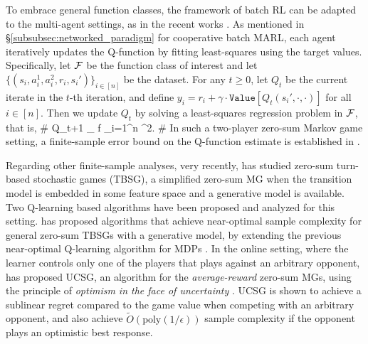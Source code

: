    
   
   To embrace general function classes, the framework of batch RL \cite{lagoudakis2002value,munos2007performance,munos2008finite,antos2008fitted,antos2008learning,farahmand2016regularized} can be adapted to  the multi-agent settings, as in the recent works  \cite{yang2019theoretical,zhang2018finite}.      As mentioned  in \S\ref{subsubsec:networked_paradigm} for cooperative batch MARL,   each agent  iteratively  updates the Q-function by fitting least-squares using  the target values.  Specifically, let $\mathcal{F}$ be the function class of interest and let $  \{ (s_i, a_i^1, a_i^2, r_i, s_i' ) \}_{i\in[n]}$ be the dataset. For any $t \geq 0$,   let $Q_{t}$ be the current iterate in the $t$-th iteration, and  define $y_i = r_i + \gamma \cdot \texttt{Value} [ Q_{t} (s_i', \cdot , \cdot )]$ for all $i \in [n]$. Then we update $ Q_{t}$   by solving a least-squares regression problem in $\mathcal{F}$, that is, 
  \#\label{eq:FQI}
  Q_{t+1} \leftarrow \argmin_{ f\in \cF}  \sum_{i=1}^n \bigl [ y_i - f(s_i, a_i^1, a_i^2 ) \bigr ]^2.
  \#
  In such a two-player zero-sum Markov game setting, 
a finite-sample error bound on the Q-function estimate  is established in    \cite{yang2019theoretical}. 


Regarding other finite-sample analyses, 
very recently, \cite{jia2019feature} has studied   zero-sum turn-based stochastic games (TBSG), a simplified zero-sum MG when the transition  model is embedded in some feature space and a generative model is available. Two Q-learning based  algorithms have been  proposed and analyzed  for this setting.  \cite{sidford2019solving} has proposed   algorithms that achieve near-optimal sample complexity for general zero-sum TBSGs with a generative model, by extending the previous near-optimal Q-learning algorithm for MDPs \cite{sidford2018near}.   
In the online setting, where the learner controls only one of the players that plays against an arbitrary opponent,  
\cite{wei2017online} has proposed UCSG, an algorithm for the  \emph{average-reward} zero-sum  MGs, using the principle of \textit{optimism in the  face of uncertainty} \cite{auer2007logarithmic, jaksch2010near}.  UCSG is shown to achieve a sublinear regret  compared to the game value when competing with an arbitrary opponent, and also achieve $\tilde O(\text{poly}(1/\epsilon))$ sample complexity if the opponent plays an optimistic best response. 



